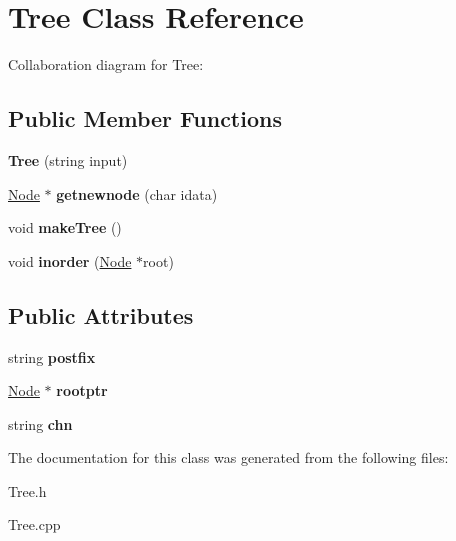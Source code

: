 \hypertarget{classTree}{}\section{Tree Class Reference}
\label{classTree}


Collaboration diagram for Tree\+:
\subsection*{Public Member Functions}
\begin{DoxyCompactItemize}
\item 
\mbox{\label{classTree_a8fdbd9e6066c144f0e9c9f75c32563b7}} 
{\bfseries Tree} (string input)
\item 
\mbox{\label{classTree_a0dcceb7f01aada20fd6960b85cac5d4d}} 
\hyperlink{classNode}{Node} $\ast$ {\bfseries getnewnode} (char idata)
\item 
\mbox{\label{classTree_aca9d395328d8e3dfb1226de8c4887b30}} 
void {\bfseries make\+Tree} ()
\item 
\mbox{\label{classTree_a8bf710147810410e50c627f7f82d569b}} 
void {\bfseries inorder} (\hyperlink{classNode}{Node} $\ast$root)
\end{DoxyCompactItemize}
\subsection*{Public Attributes}
\begin{DoxyCompactItemize}
\item 
\mbox{\label{classTree_af84beb5892e1705ec889e18fad0daa57}} 
string {\bfseries postfix}
\item 
\mbox{\label{classTree_a741866ab0f13a17473e9a28303082f32}} 
\hyperlink{classNode}{Node} $\ast$ {\bfseries rootptr}
\item 
\mbox{\label{classTree_ab9ff3e2eae9a95aecc947d14e9e53480}} 
string {\bfseries chn}
\end{DoxyCompactItemize}


The documentation for this class was generated from the following files\+:\begin{DoxyCompactItemize}
\item 
Tree.\+h\item 
Tree.\+cpp\end{DoxyCompactItemize}
